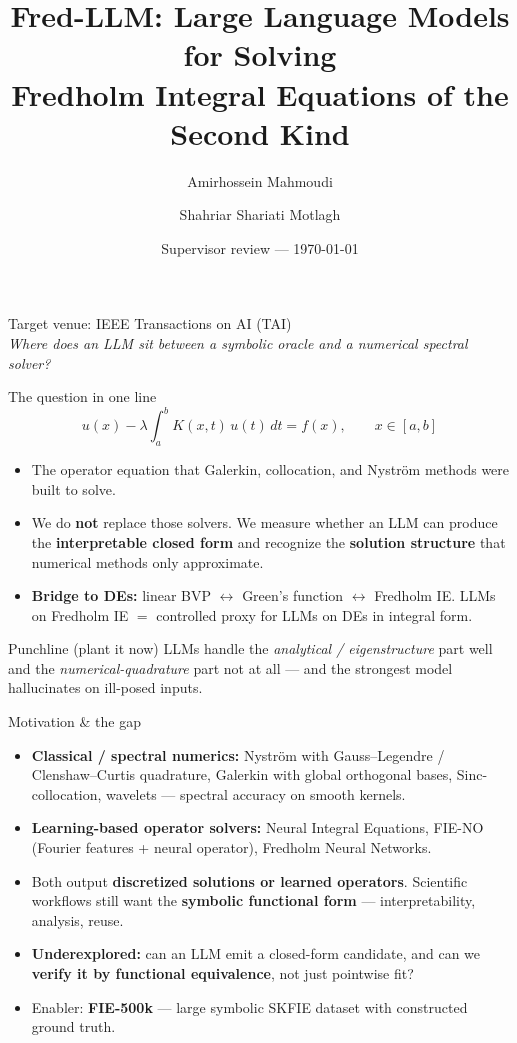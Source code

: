 \documentclass[10pt,aspectratio=169]{beamer}
\title[Fred-LLM]{Fred-LLM: Large Language Models for Solving\\ Fredholm Integral Equations of the Second Kind}
\author{Amirhossein Mahmoudi \and Shahriar Shariati Motlagh}
\date{Supervisor review --- \today}
\begin{document}
\begin{frame}[plain]
  \titlepage
  \begin{center}\small
    Target venue: IEEE Transactions on AI (TAI)\\[2pt]
    \textit{Where does an LLM sit between a symbolic oracle and a numerical spectral solver?}
  \end{center}
\end{frame}

\begin{frame}{The question in one line}
  \[
     u(x) - \lambda \int_a^b K(x,t)\,u(t)\,dt = f(x), \qquad x\in[a,b]
  \]
  \begin{itemize}
    \item The operator equation that Galerkin, collocation, and Nystr\"om methods were built to solve.
    \item We do \textbf{not} replace those solvers. We measure whether an LLM can produce the
          \textbf{interpretable closed form} and recognize the \textbf{solution structure} that
          numerical methods only approximate.
    \item \textbf{Bridge to DEs:} linear BVP $\leftrightarrow$ Green's function $\leftrightarrow$
          Fredholm IE. LLMs on Fredholm IE $=$ controlled proxy for LLMs on DEs in integral form.
  \end{itemize}
  \begin{block}{Punchline (plant it now)}
    LLMs handle the \emph{analytical / eigenstructure} part well and the
    \emph{numerical-quadrature} part not at all --- and the strongest model hallucinates on
    ill-posed inputs.
  \end{block}
\end{frame}

\begin{frame}{Motivation \& the gap}
  \begin{itemize}
    \item \textbf{Classical / spectral numerics:} Nystr\"om with Gauss--Legendre / Clenshaw--Curtis
          quadrature, Galerkin with global orthogonal bases, Sinc-collocation, wavelets ---
          spectral accuracy on smooth kernels.
    \item \textbf{Learning-based operator solvers:} Neural Integral Equations, FIE-NO
          (Fourier features + neural operator), Fredholm Neural Networks.
    \item Both output \textbf{discretized solutions or learned operators}. Scientific workflows
          still want the \textbf{symbolic functional form} --- interpretability, analysis, reuse.
    \item \textbf{Underexplored:} can an LLM emit a closed-form candidate, and can we
          \textbf{verify it by functional equivalence}, not just pointwise fit?
    \item Enabler: \textbf{FIE-500k} --- large symbolic SKFIE dataset with constructed ground truth.
  \end{itemize}
\end{frame}
\end{document}

